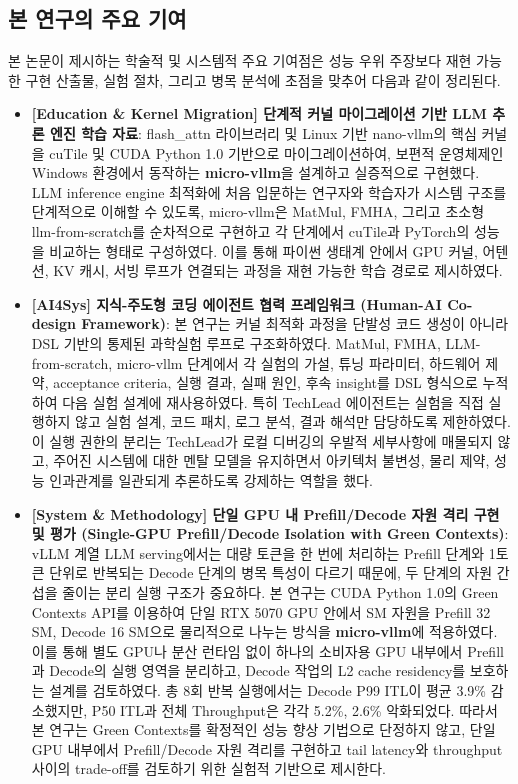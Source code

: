 \documentclass{kcc} %
\begin{document}
\subsection{본 연구의 주요 기여}

본 논문이 제시하는 학술적 및 시스템적 주요 기여점은 성능 우위 주장보다 재현 가능한 구현 산출물, 실험 절차, 그리고 병목 분석에 초점을 맞추어 다음과 같이 정리된다.


\begin{itemize}
\item \textbf{[Education \& Kernel Migration] 단계적 커널 마이그레이션 기반 LLM 추론 엔진 학습 자료}: flash\_attn 라이브러리 및 Linux 기반 nano-vllm의 핵심 커널을 cuTile 및 CUDA Python 1.0 기반으로 마이그레이션하여, 보편적 운영체제인 Windows 환경에서 동작하는 \textbf{micro-vllm}을 설계하고 실증적으로 구현했다. LLM inference engine 최적화에 처음 입문하는 연구자와 학습자가 시스템 구조를 단계적으로 이해할 수 있도록, micro-vllm은 MatMul, FMHA, 그리고 초소형 llm-from-scratch를 순차적으로 구현하고 각 단계에서 cuTile과 PyTorch의 성능을 비교하는 형태로 구성하였다. 이를 통해 파이썬 생태계 안에서 GPU 커널, 어텐션, KV 캐시, 서빙 루프가 연결되는 과정을 재현 가능한 학습 경로로 제시하였다.
\item \textbf{[AI4Sys] 지식-주도형 코딩 에이전트 협력 프레임워크 (Human-AI Co-design Framework)}: 본 연구는 커널 최적화 과정을 단발성 코드 생성이 아니라 DSL 기반의 통제된 과학실험 루프로 구조화하였다. MatMul, FMHA, LLM-from-scratch, micro-vllm 단계에서 각 실험의 가설, 튜닝 파라미터, 하드웨어 제약, acceptance criteria, 실행 결과, 실패 원인, 후속 insight를 DSL 형식으로 누적하여 다음 실험 설계에 재사용하였다. 특히 TechLead 에이전트는 실험을 직접 실행하지 않고 실험 설계, 코드 패치, 로그 분석, 결과 해석만 담당하도록 제한하였다. 이 실행 권한의 분리는 TechLead가 로컬 디버깅의 우발적 세부사항에 매몰되지 않고, 주어진 시스템에 대한 멘탈 모델을 유지하면서 아키텍처 불변성, 물리 제약, 성능 인과관계를 일관되게 추론하도록 강제하는 역할을 했다.
\item \textbf{[System \& Methodology] 단일 GPU 내 Prefill/Decode 자원 격리 구현 및 평가 (Single-GPU Prefill/Decode Isolation with Green Contexts)}: vLLM 계열 LLM serving에서는 대량 토큰을 한 번에 처리하는 Prefill 단계와 1토큰 단위로 반복되는 Decode 단계의 병목 특성이 다르기 때문에, 두 단계의 자원 간섭을 줄이는 분리 실행 구조가 중요하다. 본 연구는 CUDA Python 1.0의 Green Contexts API를 이용하여 단일 RTX 5070 GPU 안에서 SM 자원을 Prefill 32 SM, Decode 16 SM으로 물리적으로 나누는 방식을 \textbf{micro-vllm}에 적용하였다. 이를 통해 별도 GPU나 분산 런타임 없이 하나의 소비자용 GPU 내부에서 Prefill과 Decode의 실행 영역을 분리하고, Decode 작업의 L2 cache residency를 보호하는 설계를 검토하였다. 총 8회 반복 실행에서는 Decode P99 ITL이 평균 3.9\% 감소했지만, P50 ITL과 전체 Throughput은 각각 5.2\%, 2.6\% 악화되었다. 따라서 본 연구는 Green Contexts를 확정적인 성능 향상 기법으로 단정하지 않고, 단일 GPU 내부에서 Prefill/Decode 자원 격리를 구현하고 tail latency와 throughput 사이의 trade-off를 검토하기 위한 실험적 기반으로 제시한다.

\end{itemize}
\end{document}
